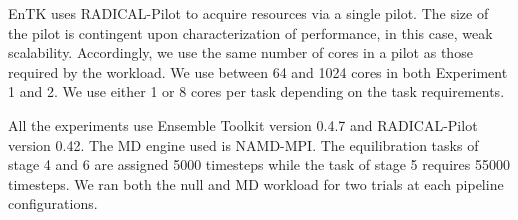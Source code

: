 
EnTK uses RADICAL-Pilot to acquire resources via a single pilot. The size of
the pilot is contingent upon characterization of performance, in this case,
weak scalability. Accordingly, we use the same number of cores in a pilot as
those required by the workload. %
We use between 64 and 1024 cores in both Experiment 1 and 2.
We use either 1 or 8 cores per task %
depending on the task requirements.




All the experiments use Ensemble Toolkit version 0.4.7 and RADICAL-Pilot
version 0.42. The MD engine used is NAMD-MPI\@. The equilibration %
tasks of stage 4 and 6 are assigned 5000 timesteps while the task of stage 5
requires 55000 timesteps. We ran both the null and MD workload for two trials
at each pipeline configurations.

